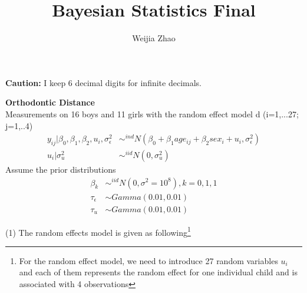 \documentclass{homeworg}
\title{Bayesian Statistics Final}
\author{Weijia Zhao}
\begin{document}
\maketitle

\textbf{Caution:} I keep 6 decimal digits for infinite decimals.

\exercise 
\textbf{Orthodontic Distance} \\
Measurements on 16 boys and 11 girls with the random effect model d (i=1,...27; j=1,..4)
\begin{align*}
y_{ij}|\beta_0, \beta_1, \beta_2, u_i, \sigma_\epsilon^2 & \sim^{ind} N(\beta_0+\beta_1 age_{ij}+\beta_2sex_i+u_i,\sigma_\epsilon^2)\\
u_i|\sigma_u^2 & \sim^{iid} N(0,\sigma_u^2)
\end{align*}
Assume the prior distributions 
\begin{align*}
\beta_k &\sim^{iid} N(0,\sigma^2=10^8), k=0,1,1\\
\tau_\epsilon & \sim Gamma(0.01,0.01)\\
\tau_u & \sim Gamma(0.01,0.01)
\end{align*}

(1) The random effects model is given as following\footnote{For the random effect model, we need to introduce 27 random variables $u_i$ and each of them represents the random effect for one individual child and is associated with 4 observations}
\end{document}
